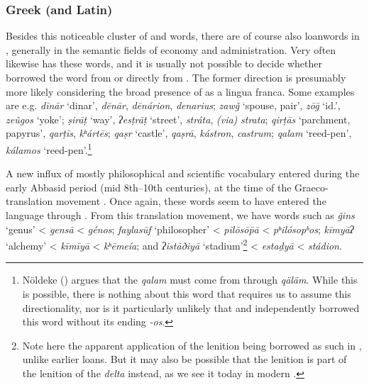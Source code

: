 \documentclass[output=paper]{langsci/langscibook}
\begin{document}
\subsubsection{\label{bkm:Ref13224479}Greek (and Latin)}

Besides this noticeable cluster of  and  words, there are of course also  {loanwords} in , generally in the semantic fields of economy and administration. Very often  likewise has these words, and it is usually not possible to decide whether  borrowed the word from  or directly from . The former direction is presumably more likely considering the broad presence of  as a lingua franca. Some examples are e.g. \textit{dīnār} ‘dinar’,  \textit{dēnār},  \textit{dēnárion},  \textit{denarius}; \textit{zawǧ} ‘spouse, pair’,  \textit{zōḡ} ‘id.’,  \textit{zeûgos} ‘yoke’; \textit{ṣirāṭ} ‘way’,  \textit{ʔesṭrāṭ} ‘street’,  \textit{stráta},  \textit{(via)} \textit{strata}; \textit{qirṭās} ‘parchment, papyrus’,  \textit{qarṭīs},  \textit{kʰártēs}; \textit{qaṣr} ‘castle’,  \textit{qaṣrā},  \textit{kástron},  \textit{castrum}; \textit{qalam} ‘reed-pen’,  \textit{kálamos} ‘reed-pen’.\footnote{Nöldeke (\citeyear[50]{Nöldeke1910}) argues that the  \textit{qalam} must come from  through  \textit{qäläm}. While this is possible, there is nothing about this word that requires us to assume this directionality, nor is it particularly unlikely that  and  independently borrowed this word without its  ending \textit{-os}.}

A new influx of mostly philosophical and scientific  vocabulary entered  during the early Abbasid period (mid 8th–10th centuries), at the time of the Graeco- translation movement \citep{Gutas1998}. Once again, these words seem to have entered the language through  \citep{Gutas2011}. From this translation movement, we have words such as \textit{ǧins} ‘genus’ <  \textit{gensā} <  \textit{génos}; \textit{faylasūf} ‘philosopher’ <  \textit{pīlōsōp̄ā} <  \textit{pʰilósopʰos}; \textit{kīmyāʔ} ‘alchemy’ <  \textit{kīmīyā} <  \textit{kʰēmeía}; and \textit{ʔistāðiyā} ‘stadium’\footnote{Note here the apparent application of the  lenition being borrowed as such in , unlike earlier loans. But it may also be possible that the lenition is part of the  lenition of the \textit{delta} instead, as we see it today in modern .} <  \textit{estaḏyā} <  \textit{stádion}.
\end{document}
